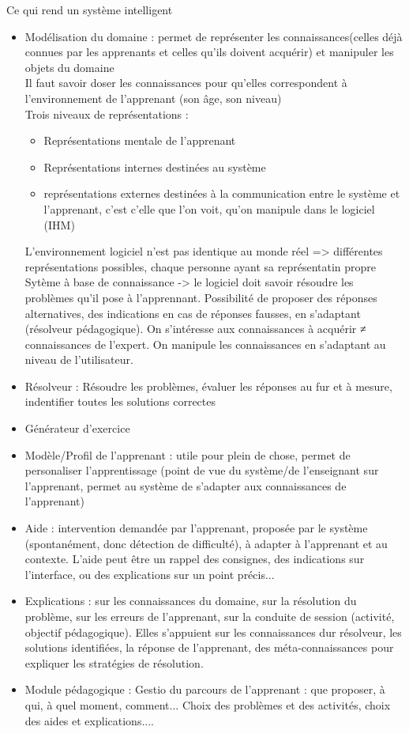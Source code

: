 
Ce qui rend un système intelligent

\begin{itemize}
	\item Modélisation du domaine : permet de représenter les connaissances(celles déjà connues par les apprenants et celles qu'ils doivent acquérir) et manipuler les objets du domaine\\
	Il faut savoir doser les connaissances pour qu'elles correspondent à l'environnement de l'apprenant (son âge, son niveau)\\
	Trois niveaux de représentations :
	\begin{itemize}
		\item Représentations mentale de l'apprenant
		\item Représentations internes destinées au système
		\item représentations externes destinées à la communication entre le système et l'apprenant, c'est c'elle que l'on voit, qu'on manipule dans le logiciel (IHM)
	\end{itemize}
	L'environnement logiciel n'est pas identique au monde réel => différentes représentations possibles, chaque personne ayant sa représentatin propre\\
	Sytème à base de connaissance -> le logiciel doit savoir résoudre les problèmes qu'il pose à l'apprennant. Possibilité de proposer des réponses alternatives, des indications en cas de réponses fausses, en s'adaptant (résolveur pédagogique). On s'intéresse aux connaissances à acquérir ≠ connaissances de l'expert. On manipule les connaissances en s'adaptant au niveau de l'utilisateur.
	\item Résolveur : Résoudre les problèmes, évaluer les réponses au fur et à mesure, indentifier toutes les solutions correctes

	\item Générateur d'exercice
	\item Modèle/Profil de l'apprenant : utile pour plein de chose, permet de personaliser l'apprentissage (point de vue du système/de l'enseignant sur l'apprenant, permet au système de s'adapter aux connaissances de l'apprenant)
	\item Aide : intervention demandée par l'apprenant, proposée par le système (spontanément, donc détection de difficulté), à adapter à l'apprenant et au contexte. L'aide peut être un rappel des consignes, des indications sur l'interface, ou des explications sur un point précis...
	\item Explications : sur les connaissances du domaine, sur la résolution du problème, sur les erreurs de l'apprenant, sur la conduite de session (activité, objectif pédagogique). Elles s'appuient sur les connaissances dur résolveur, les solutions identifiées, la réponse de l'apprenant, des méta-connaissances pour expliquer les stratégies de résolution.
	\item Module pédagogique : Gestio du parcours de l'apprenant : que proposer, à qui, à quel moment, comment... Choix des problèmes et des activités, choix des aides et explications....

\end{itemize}
